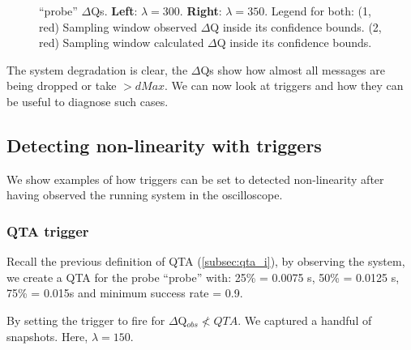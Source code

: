 \begin{figure}[H]
\begin{subfigure}{.5\textwidth}
                \label{fig:high_load_2}
            \end{subfigure}
            \caption{``probe'' $\Delta$Qs. \textbf{Left}: $\lambda = 300$. \textbf{Right}: $\lambda = 350$.  Legend for both: (1, red) Sampling window observed $\Delta$Q inside its confidence bounds. (2, red) Sampling window calculated $\Delta$Q inside its confidence bounds.}%
            \label{fig:hi_lo}%
        \end{figure}
    The system degradation is clear, the $\Delta$Qs show how almost all messages are being dropped or take $> dMax$. We can now look at triggers and how they can be useful to diagnose such cases.
  
    \subsection{Detecting non-linearity with triggers}
        We show examples of how triggers can be set to detected non-linearity after having observed the running system in the oscilloscope.

        \subsubsection{QTA trigger}
            Recall the previous definition of QTA (\cref{subsec:qta_i}), by observing the system, we create a QTA for the probe ``probe'' with: 25\% = 0.0075 s, 50\% = 0.0125 s, 75\% = 0.015s and minimum success rate = 0.9.

            By setting the trigger to fire for $\Delta$Q$_{obs} \nless QTA$. We captured a handful of snapshots. Here, $\lambda = 150$.
        
